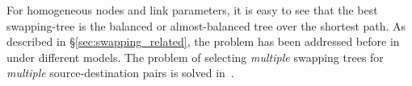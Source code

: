For homogeneous nodes and link parameters, it is easy to see that the best swapping-tree is the balanced or almost-balanced tree over the shortest path.
As described in \S\ref{sec:swapping_related}, the \spp problem has been addressed before in~\cite{sigcomm20, caleffi} under different models. 
The problem of selecting \textit{multiple} swapping trees for \textit{multiple} source-destination pairs is solved in~\cite{tqe22-quantum}.









